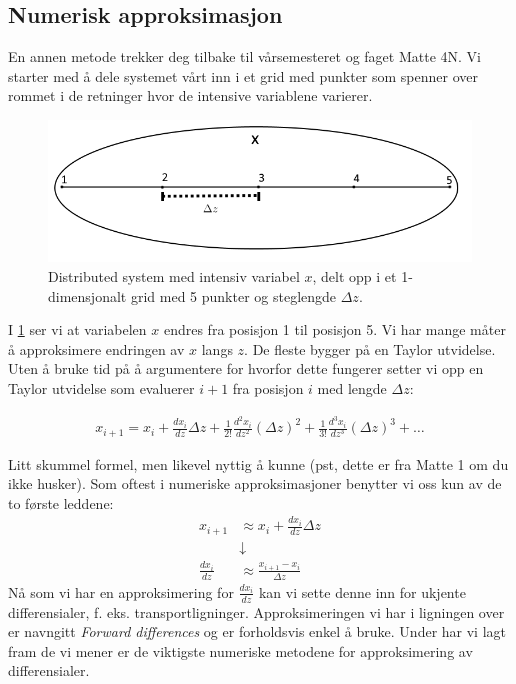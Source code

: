 \subsection{Numerisk approksimasjon}\label{sec:numerisk_approksimasjon}
En annen metode trekker deg tilbake til vårsemesteret og faget Matte 4N. Vi starter med å dele systemet vårt inn i et grid med punkter som spenner over rommet i de retninger hvor de intensive variablene varierer. 
\begin{figure}[H]
    \centering
    \includegraphics[scale=0.5]{Figures/Distributed_discret.png}
    \caption{Distributed system med intensiv variabel $x$, delt opp i et 1-dimensjonalt grid med 5 punkter og steglengde $\Delta z$.}
    \label{fig:distributed_numerisk}
\end{figure}

I \cref{fig:distributed_numerisk} ser vi at variabelen $x$ endres fra posisjon 1 til posisjon 5. Vi har mange måter å approksimere endringen av $x$ langs $z$. De fleste bygger på en Taylor utvidelse. Uten å bruke tid på å argumentere for hvorfor dette fungerer setter vi opp en Taylor utvidelse som evaluerer $i+1$ fra posisjon $i$ med lengde $\Delta z$:

\begin{align}
    x_{i+1} = x_i + \frac{dx_i}{dz}\Delta z + \frac{1}{2!}\frac{d^2x_i}{dz^2}(\Delta z)^2 + \frac{1}{3!}\frac{d^3x_i}{dz^3}(\Delta z)^3 + \dots
\end{align}

Litt skummel formel, men likevel nyttig å kunne (pst, dette er fra Matte 1 om du ikke husker). Som oftest i numeriske approksimasjoner benytter vi oss kun av de to første leddene:
\begin{align}
    x_{i+1} &\approx x_i + \frac{dx_i}{dz}\Delta z\\
    &\downarrow \\
    \frac{dx_i}{dz} &\approx \frac{x_{i+1}-x_i}{\Delta z}
\end{align}
Nå som vi har en approksimering for $\frac{dx_i}{dz}$ kan vi sette denne inn for ukjente differensialer, f. eks. transportligninger. Approksimeringen vi har i ligningen over er navngitt \textit{Forward differences} og er forholdsvis enkel å bruke. Under har vi lagt fram de vi mener er de viktigste numeriske metodene for approksimering av differensialer. 

